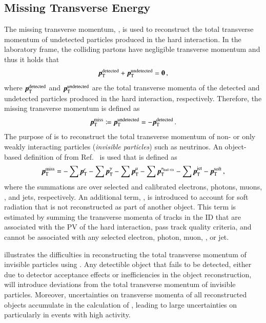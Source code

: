 \subsection{Missing Transverse Energy}%
\label{sec:atlas_met}

The missing transverse momentum, \pTmiss, is used to reconstruct the total
transverse momentum of undetected particles produced in the hard interaction. In
the laboratory frame, the colliding partons have negligible transverse momentum
and thus it holds that
\begin{align*}
  \myvec{p}_{\text{T}}^{\text{detected}} + \myvec{p}_{\text{T}}^{\text{undetected}} = \myvec{0} \,\text{,}
\end{align*}
where $\myvec{p}_{\text{T}}^{\text{detected}}$ and
$\myvec{p}_{\text{T}}^{\text{undetected}}$ are the total transverse momenta of
the detected and undetected particles produced in the hard interaction,
respectively. Therefore, the missing transverse momentum is defined as
\begin{align*}
  \pTmiss
  \coloneqq \myvec{p}_{\text{T}}^{\text{undetected}}
  = -\myvec{p}_{\text{T}}^{\text{detected}} \,\text{.}
\end{align*}
The purpose of \pTmiss is to reconstruct the total transverse momentum of non-
or only weakly interacting particles (\emph{invisible particles}) such as
neutrinos. An object-based definition of \pTmiss from Ref.~\cite{PERF-2016-07}
is used that is defined as
\begin{align}
  \pTmiss =
  - \sum \pTvec{e}
  - \sum \pTvec{\gamma}
  - \sum \pTvec{\mu}
  - \sum \pTvec{\tauhadvis}
  - \sum \pTvec{\text{jet}}
  - \pTvec{\text{soft}}
  \,\text{,}
  \label{eq:met}
\end{align}
where the summations are over selected and calibrated electrons, photons, muons,
\tauhadvis, and jets, respectively. An additional term, , is
introduced to account for soft radiation that is not reconstructed as part of
another object. This term is estimated by summing the transverse momenta of
tracks in the ID that are associated with the PV of the hard interaction, pass
track quality criteria, and cannot be associated with any selected electron,
photon, muon, \tauhadvis, or jet.

 illustrates the difficulties in reconstructing the total
transverse momentum of invisible particles using \pTmiss. Any detectible object
that fails to be detected, either due to detector acceptance effects or
inefficiencies in the object reconstruction, will introduce deviations from the
total transverse momentum of invisible particles. Moreover, uncertainties on
transverse momenta of all reconstructed objects accumulate in the calculation of
\pTmiss, leading to large uncertainties on \pTmiss particularly in events with
high activity.

